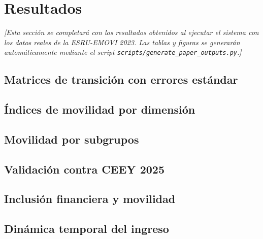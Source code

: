\documentclass[12pt, a4paper]{article}
\begin{document}
\section{Resultados}
\label{sec:results}

\textit{[Esta sección se completará con los resultados obtenidos al ejecutar el sistema con los datos reales de la ESRU-EMOVI 2023. Las tablas y figuras se generarán automáticamente mediante el script \texttt{scripts/generate\_paper\_outputs.py}.]}

\subsection{Matrices de transición con errores estándar}

% 

\subsection{Índices de movilidad por dimensión}

% 

\subsection{Movilidad por subgrupos}

% 

\subsection{Validación contra CEEY 2025}

% 

\subsection{Inclusión financiera y movilidad}

% 

\subsection{Dinámica temporal del ingreso}
\end{document}

